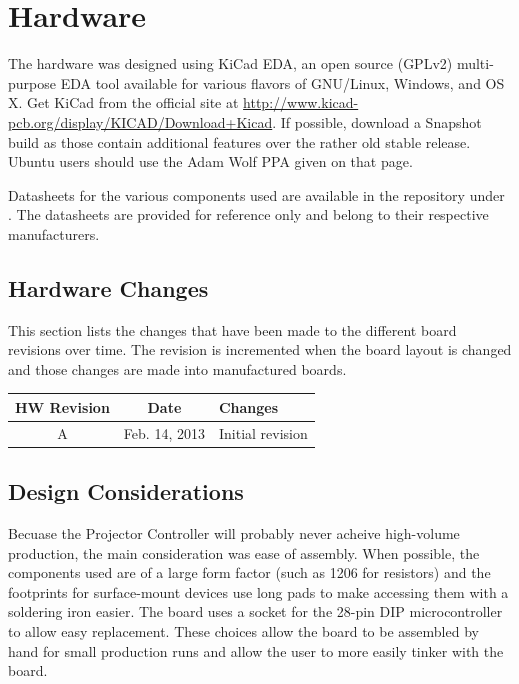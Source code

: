 \documentclass{article}
\begin{document}
\section{Hardware} \label{sec:Hardware}
The hardware was designed using KiCad EDA, an open source (GPLv2) multi-purpose EDA tool available
for various flavors of GNU/Linux, Windows, and OS X.  Get KiCad from the official site at
\url{http://www.kicad-pcb.org/display/KICAD/Download+Kicad}.  If possible, download a Snapshot build
as those contain additional features over the rather old stable release.  Ubuntu users should use
the Adam Wolf PPA given on that page.

Datasheets for the various components used are available in the repository under
.  The datasheets are provided for reference only and belong to their
respective manufacturers.

\subsection{Hardware Changes} \label{ssec:HWChanges}
This section lists the changes that have been made to the different board revisions over time.  The
revision is incremented when the board layout is changed and those changes are made into
manufactured boards.

\begin{center}
    \begin{tabular}{c|c|p{}}
        HW Revision & Date & Changes \\
        \hline
        A & Feb. 14, 2013 & Initial revision \\
    \end{tabular}
\end{center}

\subsection{Design Considerations} \label{ssec:DesignConsid}
Becuase the Projector Controller will probably never acheive high-volume production, the main
consideration was ease of assembly.  When possible, the components used are of a large form factor
(such as 1206 for resistors) and the footprints for surface-mount devices use long pads to make
accessing them with a soldering iron easier.  The board uses a socket for the 28-pin DIP
microcontroller to allow easy replacement.  These choices allow the board to be assembled by hand
for small production runs and allow the user to more easily tinker with the board.
\end{document}
